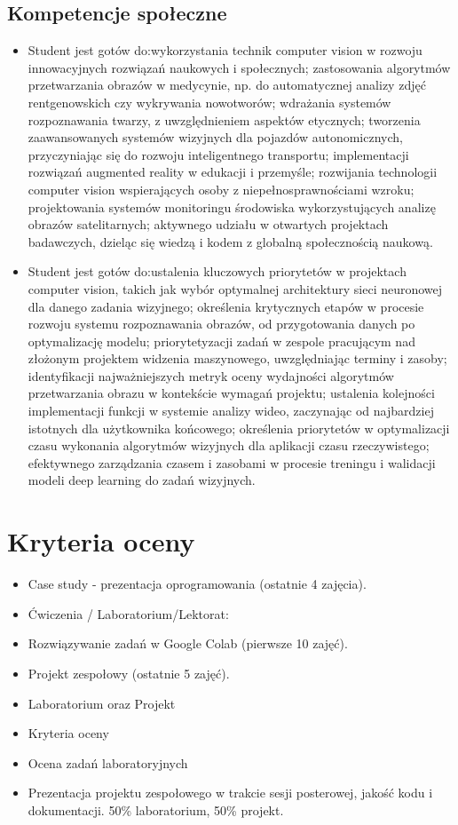 \documentclass[12pt, a4paper]{article}
\begin{document}
\subsection*{Kompetencje społeczne}
\begin{itemize}
  \item Student jest gotów do:wykorzystania technik computer vision w rozwoju innowacyjnych rozwiązań naukowych i społecznych; zastosowania algorytmów przetwarzania obrazów w medycynie, np. do automatycznej analizy zdjęć rentgenowskich czy wykrywania nowotworów; wdrażania systemów rozpoznawania twarzy, z uwzględnieniem aspektów etycznych; tworzenia zaawansowanych systemów wizyjnych dla pojazdów autonomicznych, przyczyniając się do rozwoju inteligentnego transportu; implementacji rozwiązań augmented reality w edukacji i przemyśle; rozwijania technologii computer vision wspierających osoby z niepełnosprawnościami wzroku; projektowania systemów monitoringu środowiska wykorzystujących analizę obrazów satelitarnych; aktywnego udziału w otwartych projektach badawczych, dzieląc się wiedzą i kodem z globalną społecznością naukową.
  \item Student jest gotów do:ustalenia kluczowych priorytetów w projektach computer vision, takich jak wybór optymalnej architektury sieci neuronowej dla danego zadania wizyjnego; określenia krytycznych etapów w procesie rozwoju systemu rozpoznawania obrazów, od przygotowania danych po optymalizację modelu; priorytetyzacji zadań w zespole pracującym nad złożonym projektem widzenia maszynowego, uwzględniając terminy i zasoby; identyfikacji najważniejszych metryk oceny wydajności algorytmów przetwarzania obrazu w kontekście wymagań projektu; ustalenia kolejności implementacji funkcji w systemie analizy wideo, zaczynając od najbardziej istotnych dla użytkownika końcowego; określenia priorytetów w optymalizacji czasu wykonania algorytmów wizyjnych dla aplikacji czasu rzeczywistego; efektywnego zarządzania czasem i zasobami w procesie treningu i walidacji modeli deep learning do zadań wizyjnych.
\end{itemize}

\section{Kryteria oceny}

\begin{itemize}
  \item Case study - prezentacja oprogramowania (ostatnie 4 zajęcia).
  \item Ćwiczenia / Laboratorium/Lektorat:
  \item Rozwiązywanie zadań w Google Colab (pierwsze 10 zajęć).
  \item Projekt zespołowy (ostatnie 5 zajęć).
  \item Laboratorium oraz Projekt
  \item Kryteria oceny
  \item Ocena zadań laboratoryjnych
  \item Prezentacja projektu zespołowego w trakcie sesji posterowej, jakość kodu i dokumentacji. 50\% laboratorium, 50\% projekt.
\end{itemize}
\end{document}
